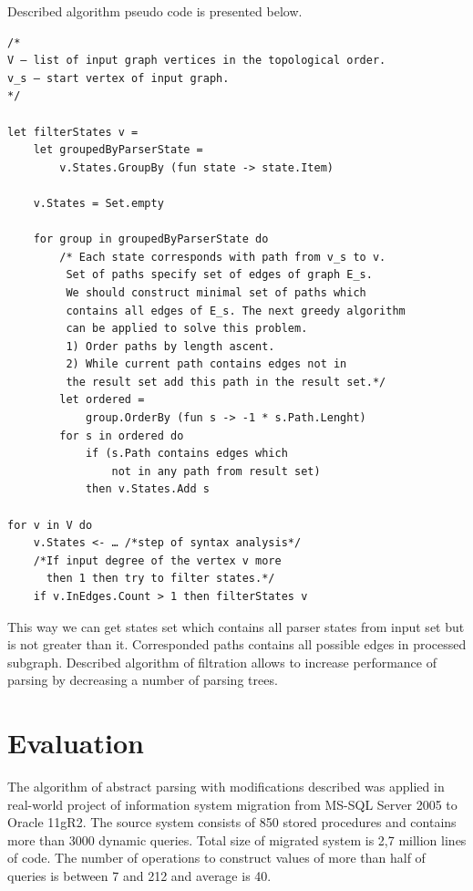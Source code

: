 \documentclass{llncs}
\begin{document}
Described algorithm pseudo code is presented below.
\begin{verbatim}
/*
V – list of input graph vertices in the topological order.
v_s – start vertex of input graph.
*/

let filterStates v =
    let groupedByParserState =
        v.States.GroupBy (fun state -> state.Item)

    v.States = Set.empty

    for group in groupedByParserState do
        /* Each state corresponds with path from v_s to v.
         Set of paths specify set of edges of graph E_s.
         We should construct minimal set of paths which
         contains all edges of E_s. The next greedy algorithm
         can be applied to solve this problem.
         1) Order paths by length ascent.
         2) While current path contains edges not in
         the result set add this path in the result set.*/
        let ordered = 
            group.OrderBy (fun s -> -1 * s.Path.Lenght)
        for s in ordered do
            if (s.Path contains edges which 
                not in any path from result set) 
            then v.States.Add s

for v in V do
    v.States <- … /*step of syntax analysis*/
    /*If input degree of the vertex v more 
      then 1 then try to filter states.*/
    if v.InEdges.Count > 1 then filterStates v

\end{verbatim}

This way we can get states set which contains all parser states from input set but is not greater than it. Corresponded paths contains all possible edges in processed subgraph. Described algorithm of filtration allows to increase performance of parsing by decreasing a number of parsing trees.

\section{Evaluation}
\label{sec:Evaluation}

The algorithm of abstract parsing with modifications described was applied in real-world project of information system migration from MS-SQL Server 2005 to Oracle 11gR2. The source system consists of 850 stored procedures and contains more than 3000 dynamic queries. Total size of migrated system is 2,7 million lines of code. The number of operations to construct values of more than half of queries is between 7 and 212 and average is 40.
\end{document}
